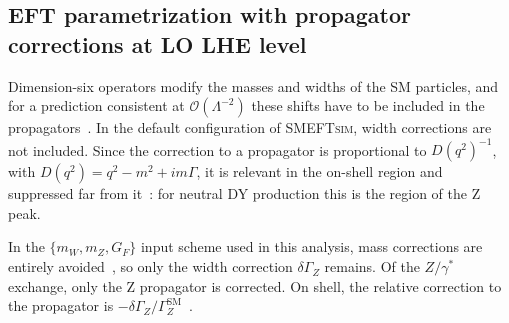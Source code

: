 %
%

\subsection{EFT parametrization with propagator corrections at LO LHE level}
\label{sec:eft_propcorr}

Dimension-six operators modify the masses and widths of the SM particles, and
for a prediction consistent at $\mathcal{O}(\Lambda^{-2})$ these shifts have to
be included in the propagators~\cite{Brivio:2020onw}.
In the default configuration of \textsc{SMEFTsim}, width corrections are not
included. Since the correction to a propagator is proportional to
$D(q^2)^{-1}$, with $D(q^2) = q^2 - m^2 + i m\Gamma$, it is relevant in the
on-shell region and suppressed far from it~\cite{Brivio:2020onw}: for neutral
DY production this is the region of the Z peak.

In the $\{m_W, m_Z, G_F\}$ input scheme used in this analysis, mass corrections
are entirely avoided~\cite{Brivio:2020onw}, so only the width correction
$\delta\Gamma_Z$ remains. Of the $Z/\gamma^*$ exchange, only the Z propagator is
corrected. On shell, the relative correction to the propagator is
$-\delta\Gamma_Z/\Gamma_Z^{\mathrm{SM}}$~\cite[Eq.~(6.10)]{Brivio:2020onw}.

